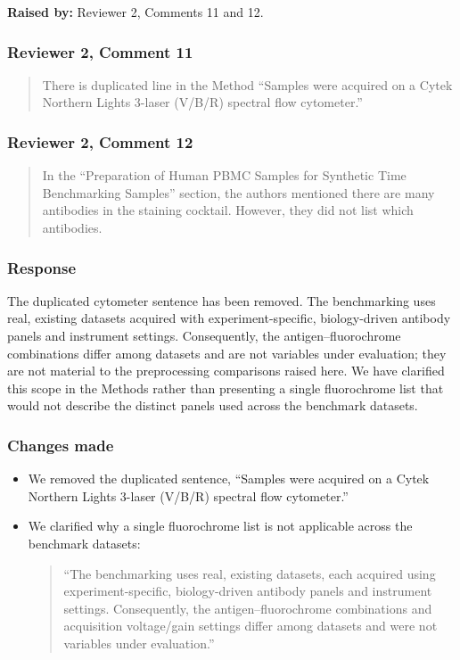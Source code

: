 \documentclass[
  11pt,
  a4paper,
]{article}
\begin{document}
\textbf{Raised by:} Reviewer 2, Comments 11 and 12.

\subsubsection{Reviewer 2, Comment 11}\label{reviewer-2-comment-11}

\begin{quote}
There is duplicated line in the Method ``Samples were acquired on a
Cytek Northern Lights 3-laser (V/B/R) spectral flow cytometer.''
\end{quote}

\subsubsection{Reviewer 2, Comment 12}\label{reviewer-2-comment-12}

\begin{quote}
In the ``Preparation of Human PBMC Samples for Synthetic Time
Benchmarking Samples'' section, the authors mentioned there are many
antibodies in the staining cocktail. However, they did not list which
antibodies.
\end{quote}

\subsubsection{Response}\label{response-12}

The duplicated cytometer sentence has been removed. The benchmarking
uses real, existing datasets acquired with experiment-specific,
biology-driven antibody panels and instrument settings. Consequently,
the antigen--fluorochrome combinations differ among datasets and are not
variables under evaluation; they are not material to the preprocessing
comparisons raised here. We have clarified this scope in the Methods
rather than presenting a single fluorochrome list that would not
describe the distinct panels used across the benchmark datasets.

\subsubsection{Changes made}\label{changes-made-12}

\begin{itemize}
\item
  We removed the duplicated sentence, ``Samples were acquired on a Cytek
  Northern Lights 3-laser (V/B/R) spectral flow cytometer.''
\item
  We clarified why a single fluorochrome list is not applicable across
  the benchmark datasets:

  \begin{quote}
  ``The benchmarking uses real, existing datasets, each acquired using
  experiment-specific, biology-driven antibody panels and instrument
  settings. Consequently, the antigen--fluorochrome combinations and
  acquisition voltage/gain settings differ among datasets and were not
  variables under evaluation.''
  \end{quote}
\end{itemize}
\end{document}
